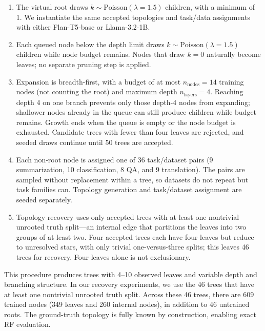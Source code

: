 \documentclass{article}
\theoremstyle{definition}
\theoremstyle{plain}
\begin{document}
\begin{enumerate}
    \item The virtual root draws $k \sim \mathrm{Poisson}(\lambda = 1.5)$ children, with a minimum of 1. We instantiate the same accepted topologies and task/data assignments with either Flan-T5-base or Llama-3.2-1B.
    \item Each queued node below the depth limit draws $k \sim \mathrm{Poisson}(\lambda = 1.5)$ children while node budget remains. Nodes that draw $k = 0$ naturally become leaves; no separate pruning step is applied.
    \item Expansion is breadth-first, with a budget of at most $n_\mathrm{nodes} = 14$ training nodes (not counting the root) and maximum depth $n_\mathrm{layers} = 4$. Reaching depth 4 on one branch prevents only those depth-4 nodes from expanding; shallower nodes already in the queue can still produce children while budget remains. Growth ends when the queue is empty or the node budget is exhausted. Candidate trees with fewer than four leaves are rejected, and seeded draws continue until 50 trees are accepted.
    \item Each non-root node is assigned one of 36 task/dataset pairs (9 summarization, 10 classification, 8 QA, and 9 translation). The pairs are sampled without replacement within a tree, so datasets do not repeat but task families can. Topology generation and task/dataset assignment are seeded separately.
    \item Topology recovery uses only accepted trees with at least one nontrivial unrooted truth split---an internal edge that partitions the leaves into two groups of at least two. Four accepted trees each have four leaves but reduce to unresolved stars, with only trivial one-versus-three splits; this leaves 46 trees for recovery. Four leaves alone is not exclusionary.
\end{enumerate}

This procedure produces trees with 4--10 observed leaves and variable depth and branching
structure. In our recovery experiments, we use the 46 trees that have at least one nontrivial
unrooted truth split. Across these 46 trees, there are 609 trained nodes (349 leaves and 260 internal
nodes), in addition to 46 untrained roots. The ground-truth topology is fully known by construction,
enabling exact RF evaluation.
\end{document}
